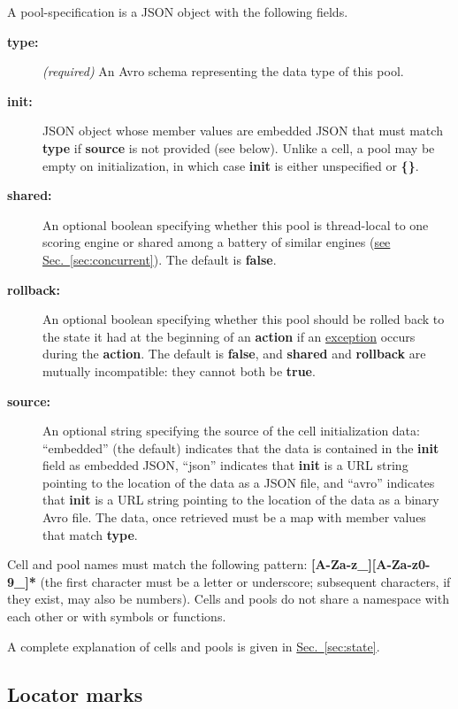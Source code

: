 \documentclass{article}
\newcommand{\PFAc}{\ttfamily\bfseries}
\newenvironment{allowedfields}%
  {\begin{center} \begin{minipage}{0.9\linewidth} \begin{description}}%
  {\end{description} \end{minipage} \end{center}}
\theoremstyle{definition}
\begin{document}
A pool-specification is a JSON object with the following fields.
\begin{allowedfields}
\item[\PFAc type:] {\it (required)} An Avro schema representing the data type of this pool.
\item[\PFAc init:] JSON object whose member values are embedded JSON that must match {\PFAc type} if {\PFAc source} is not provided (see below).  Unlike a cell, a pool may be empty on initialization, in which case {\PFAc init} is either unspecified or {\PFAc \{\}}.
\item[\PFAc shared:] An optional boolean specifying whether this pool is thread-local to one scoring engine or shared among a battery of similar engines (\hyperlink{hsec:concurrent}{see Sec.~\ref{sec:concurrent}}).  The default is {\PFAc false}.
\item[\PFAc rollback:] An optional boolean specifying whether this pool should be rolled back to the state it had at the beginning of an {\PFAc action} if an \hyperlink{hsec:exceptions}{exception} occurs during the {\PFAc action}.  The default is {\PFAc false}, and {\PFAc shared} and {\PFAc rollback} are mutually incompatible: they cannot both be {\PFAc true}.
\item[\PFAc source:] An optional string specifying the source of the cell initialization data: ``embedded'' (the default) indicates that the data is contained in the {\PFAc init} field as embedded JSON, ``json'' indicates that {\PFAc init} is a URL string pointing to the location of the data as a JSON file, and ``avro'' indicates that {\PFAc init} is a URL string pointing to the location of the data as a binary Avro file.  The data, once retrieved must be a map with member values that match {\PFAc type}.
\end{allowedfields}

Cell and pool names must match the following pattern: {\PFAc [A-Za-z\_][A-Za-z0-9\_]*} (the first character must be a letter or underscore; subsequent characters, if they exist, may also be numbers).  Cells and pools do not share a namespace with each other or with symbols or functions.

A complete explanation of cells and pools is given in \hyperlink{hsec:state}{Sec.~\ref{sec:state}}.

\subsection{Locator marks}
\end{document}
